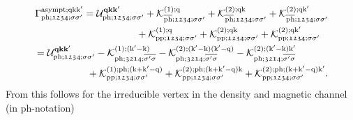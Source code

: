 \documentclass[../../main.tex]{subfiles}
\begin{document}
\begin{subequations}
\begin{align}
\begin{split}
	\Gamma_{\text{ph};\mathfrak{1234};\sigma\sigma'}^{\text{asympt};\text{q}\text{k}\text{k}'}&=\mathcal{U}^{\textbf{qkk}'}_{\text{ph};\mathfrak{1234};\sigma\sigma'}+\mathcal{K}^{(1);\text{q}}_{\overline{\text{ph}};\mathfrak{1234};\sigma\sigma'} + \mathcal{K}^{(2);\text{q}\text{k}}_{\overline{\text{ph}};\mathfrak{1234};\sigma\sigma'}+\mathcal{K}^{(2);\text{q}\text{k}'}_{\overline{\text{ph}};\mathfrak{1234};\sigma\sigma'}\\
	&\qquad\qquad\quad\;\,+\mathcal{K}^{(1);\text{q}}_{\text{pp};\mathfrak{1234};\sigma\sigma'} + \mathcal{K}^{(2);\text{q}\text{k}}_{\text{pp};\mathfrak{1234};\sigma\sigma'}+\mathcal{K}^{(2);\text{q}\text{k}'}_{\text{pp};\mathfrak{1234};\sigma\sigma'}
\end{split}\\
\begin{split}
	&=\mathcal{U}^{\textbf{qkk}'}_{\text{ph};\mathfrak{1234};\sigma\sigma'}-\mathcal{K}^{(1);(\text{k}'-\text{k})}_{\text{ph};\mathfrak{3214};\overline{\sigma'\sigma}} - \mathcal{K}^{(2);(\text{k}'-\text{k})(\text{k}'-\text{q})}_{\text{ph};\mathfrak{3214};\overline{\sigma'\sigma}}-\mathcal{K}^{(2);(\text{k}'-\text{k})\text{k}'}_{\text{ph};\mathfrak{3214};\overline{\sigma'\sigma}}\\
	&\qquad\qquad\quad\;\,+\mathcal{K}^{(1);\text{ph};(\text{k}+\text{k}'-\text{q})}_{\text{pp};\mathfrak{1234};\sigma\sigma'} + \mathcal{K}^{(2);\text{ph};(\text{k}+\text{k}'-\text{q})\text{k}}_{\text{pp};\mathfrak{1234};\sigma\sigma'}+\mathcal{K}^{(2);\text{ph};(\text{k}+\text{k}'-\text{q})\text{k}'}_{\text{pp};\mathfrak{1234};\sigma\sigma'}.
\end{split}
\end{align}
\end{subequations}
From this follows for the irreducible vertex in the density and magnetic channel (in ph-notation)
\end{document}

